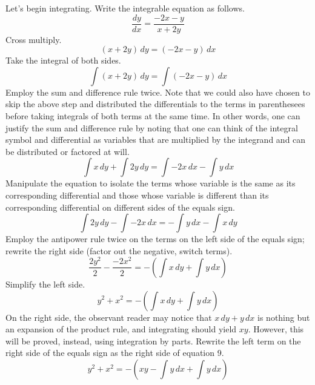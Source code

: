 \documentclass{article}
\begin{document}
Let's begin integrating. Write the integrable equation as follows.
\begin{equation*}
    \frac{dy}{dx}=\frac{-2x-y}{x+2y}
\end{equation*}
Cross multiply.
\begin{equation*}
    (x+2y)\, dy=(-2x-y)\, dx
\end{equation*}
Take the integral of both sides.
\begin{equation*}
    \int (x+2y)\, dy=\int (-2x-y)\, dx
\end{equation*}
Employ the sum and difference rule twice. Note that we could also have chosen to skip the above step and distributed the differentials to the terms in parenthesees before taking integrals of both terms at the same time. In other words, one can justify the sum and difference rule by noting that one can think of the integral symbol and differential as variables that are multiplied by the integrand and can be distributed or factored at will.
\begin{equation*}
    \int x\, dy+\int 2y\, dy=\int -2x\, dx-\int y\, dx
\end{equation*}
Manipulate the equation to isolate the terms whose variable is the same as its corresponding differential and those whose variable is different than its corresponding differential on different sides of the equals sign.
\begin{equation*}
    \int 2y\, dy-\int -2x\, dx=-\int y\, dx-\int x\, dy
\end{equation*}
Employ the antipower rule twice on the terms on the left side of the equals sign; rewrite the right side (factor out the negative, switch terms).
\vspace{-1em}
\begin{equation*}
    \frac{2y^2}{2}-\frac{-2x^2}{2}=-\left(\int x\, dy+\int y\, dx\right)
\end{equation*}
Simplify the left side.
\vspace{-1em}
\begin{equation*}
    y^2+x^2=-\left(\int x\, dy+\int y\, dx\right)
\end{equation*}
On the right side, the observant reader may notice that $x\, dy+y\, dx$ is nothing but an expansion of the product rule, and integrating should yield $xy$. However, this will be proved, instead, using integration by parts. Rewrite the left term on the right side of the equals sign as the right side of equation 9.
\begin{equation*}
    y^2+x^2=-\left(xy-\int y\, dx+\int y\, dx\right)
\end{equation*}
\end{document}
